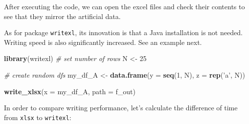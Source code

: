 \documentclass[
  12pt,
]{book}
\newenvironment{Shaded}{\begin{snugshade}}{\end{snugshade}}
\newcommand{\CommentTok}[1]{\textcolor[rgb]{0.37,0.37,0.37}{\textit{#1}}}
\newcommand{\DataTypeTok}[1]{\textcolor[rgb]{0.27,0.27,0.27}{#1}}
\newcommand{\DecValTok}[1]{\textcolor[rgb]{0.06,0.06,0.06}{#1}}
\newcommand{\KeywordTok}[1]{\textcolor[rgb]{0.27,0.27,0.27}{\textbf{#1}}}
\newcommand{\NormalTok}[1]{#1}
\newcommand{\StringTok}[1]{\textcolor[rgb]{0.5,0.5,0.5}{#1}}
\begin{document}
After executing the code, we can open the excel files and check their contents to see that they mirror the artificial data.

As for package \texttt{writexl}, its innovation is that a Java installation is not needed. Writing speed is also significantly increased. See an example next. 

\begin{Shaded}
\begin{Highlighting}[]
\KeywordTok{library}\NormalTok{(writexl)}
\CommentTok{# set number of rows}
\NormalTok{N <-}\StringTok{ }\DecValTok{25}

\CommentTok{# create random dfs}
\NormalTok{my_df_A <-}\StringTok{ }\KeywordTok{data.frame}\NormalTok{(}\DataTypeTok{y =} \KeywordTok{seq}\NormalTok{(}\DecValTok{1}\NormalTok{, N),}
                      \DataTypeTok{z =} \KeywordTok{rep}\NormalTok{(}\StringTok{'a'}\NormalTok{, N))}

\KeywordTok{write_xlsx}\NormalTok{(}\DataTypeTok{x =}\NormalTok{ my_df_A,}
           \DataTypeTok{path =}\NormalTok{ f_out)}
\end{Highlighting}
\end{Shaded}

In order to compare writing performance, let's calculate the difference of time from \texttt{xlsx} to \texttt{writexl}:
\end{document}
